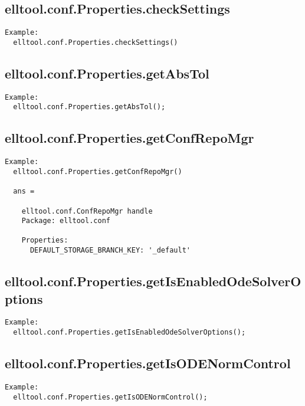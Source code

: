 \subsection{\texorpdfstring{elltool.conf.Properties.checkSettings}{checkSettings}}\label{method:elltool.conf.Properties.checkSettings}
\begin{verbatim}
Example:
  elltool.conf.Properties.checkSettings()
\end{verbatim}
\subsection{\texorpdfstring{elltool.conf.Properties.getAbsTol}{getAbsTol}}\label{method:elltool.conf.Properties.getAbsTol}
\begin{verbatim}
Example:
  elltool.conf.Properties.getAbsTol();
\end{verbatim}
\subsection{\texorpdfstring{elltool.conf.Properties.getConfRepoMgr}{getConfRepoMgr}}\label{method:elltool.conf.Properties.getConfRepoMgr}
\begin{verbatim}
Example:
  elltool.conf.Properties.getConfRepoMgr()

  ans =

    elltool.conf.ConfRepoMgr handle
    Package: elltool.conf

    Properties:
      DEFAULT_STORAGE_BRANCH_KEY: '_default'
\end{verbatim}
\subsection{\texorpdfstring{elltool.conf.Properties.getIsEnabledOdeSolverOptions}{getIsEnabledOdeSolverOptions}}\label{method:elltool.conf.Properties.getIsEnabledOdeSolverOptions}
\begin{verbatim}
Example:
  elltool.conf.Properties.getIsEnabledOdeSolverOptions();
\end{verbatim}
\subsection{\texorpdfstring{elltool.conf.Properties.getIsODENormControl}{getIsODENormControl}}\label{method:elltool.conf.Properties.getIsODENormControl}
\begin{verbatim}
Example:
  elltool.conf.Properties.getIsODENormControl();
\end{verbatim}
